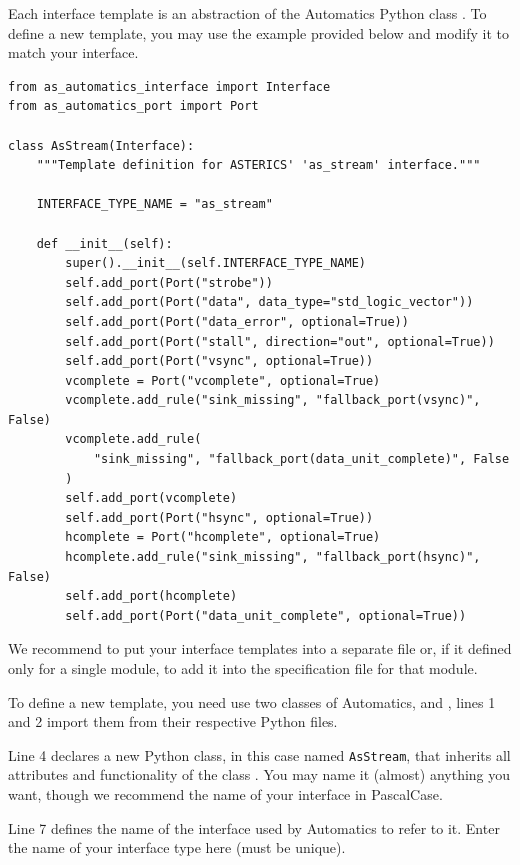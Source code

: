 Each interface template is an abstraction of the Automatics Python class .
To define a new template, you may use the example provided below and modify it to match your interface.

\begin{lstlisting}[style=AutomaticsPython]
from as_automatics_interface import Interface
from as_automatics_port import Port

class AsStream(Interface):
    """Template definition for ASTERICS' 'as_stream' interface."""

    INTERFACE_TYPE_NAME = "as_stream"

    def __init__(self):
        super().__init__(self.INTERFACE_TYPE_NAME)
        self.add_port(Port("strobe"))
        self.add_port(Port("data", data_type="std_logic_vector"))
        self.add_port(Port("data_error", optional=True))
        self.add_port(Port("stall", direction="out", optional=True))
        self.add_port(Port("vsync", optional=True))
        vcomplete = Port("vcomplete", optional=True)
        vcomplete.add_rule("sink_missing", "fallback_port(vsync)", False)
        vcomplete.add_rule(
            "sink_missing", "fallback_port(data_unit_complete)", False
        )
        self.add_port(vcomplete)
        self.add_port(Port("hsync", optional=True))
        hcomplete = Port("hcomplete", optional=True)
        hcomplete.add_rule("sink_missing", "fallback_port(hsync)", False)
        self.add_port(hcomplete)
        self.add_port(Port("data_unit_complete", optional=True))

\end{lstlisting}

We recommend to put your interface templates into a separate file or, if it defined only for a single module, to add it into the specification file for that module.

To define a new template, you need use two classes of Automatics,  and , lines 1 and 2 import them from their respective Python files.

Line 4 declares a new Python class, in this case named \texttt{AsStream}, that inherits all attributes and functionality of the class .
You may name it (almost) anything you want, though we recommend the name of your interface in PascalCase.

Line 7 defines the name of the interface used by Automatics to refer to it.
Enter the name of your interface type here (must be unique).

